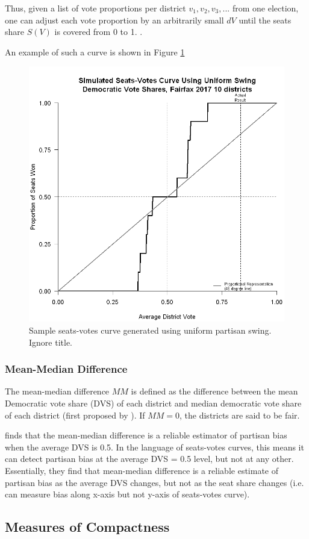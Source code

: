 Thus, given a list of vote proportions per district ${v_1, v_2, v_3, ...}$ from one election, one can adjust each vote proportion by an arbitrarily small $dV$ until the seats share $S(V)$ is covered from 0 to 1. \parencite{katz2020}.

An example of such a curve is shown in Figure \ref{fig:seatsvotesups1}

\begin{figure}
    \includegraphics[width=0.5\linewidth]{img/seatsvotesups.png}
    \caption{Sample seats-votes curve generated using uniform partisan swing. Ignore title. \parencite[175]{katz2020}}
    \label{fig:seatsvotesups1}
\end{figure}

\subsubsection{Mean-Median Difference}

The mean-median difference $MM$ is defined as the difference between the mean Democratic vote share (DVS) of each district and median democratic vote share of each district (first proposed by \textcite{mcdonald2015}). If $MM = 0$, the districts are said to be fair. 

\textcite{katz2020} finds that the mean-median difference is a reliable estimator of partisan bias when the average DVS is 0.5. In the language of seats-votes curves, this means it can detect partisan bias at the average DVS = 0.5 level, but not at any other. Essentially, they find that mean-median difference is a reliable estimate of partisan bias as the average DVS changes, but not as the seat share changes (i.e. can measure bias along x-axis but not y-axis of seats-votes curve). \parencite[27-9]{katz2020}

\subsection{Measures of Compactness}

